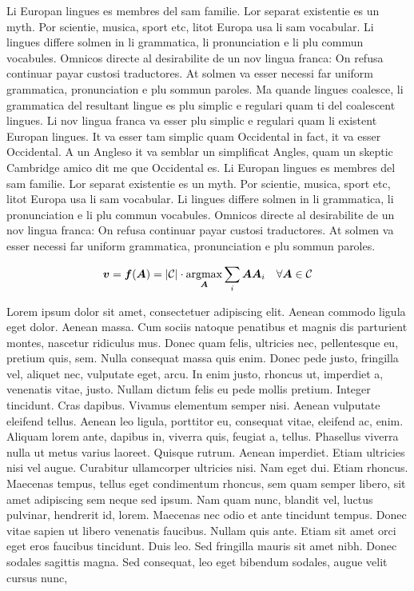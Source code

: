 Li Europan lingues es membres del sam familie. Lor separat existentie es un 
myth. Por scientie, musica, sport etc, litot Europa usa li sam vocabular. Li 
lingues differe solmen in li grammatica, li pronunciation e li plu commun 
vocabules. Omnicos directe al desirabilite de un nov lingua franca: On refusa 
continuar payar custosi traductores. At solmen va esser necessi far uniform 
grammatica, pronunciation e plu sommun paroles. Ma quande lingues coalesce, li 
grammatica del resultant lingue es plu simplic e regulari quam ti del coalescent 
lingues. Li nov lingua franca va esser plu simplic e regulari quam li existent 
Europan lingues. It va esser tam simplic quam Occidental in fact, it va esser 
Occidental. A un Angleso it va semblar un simplificat Angles, quam un skeptic 
Cambridge amico dit me que Occidental es. Li Europan lingues es membres del sam 
familie. Lor separat existentie es un myth. Por scientie, musica, sport etc, 
litot Europa usa li sam vocabular. Li lingues differe solmen in li grammatica, 
li pronunciation e li plu commun vocabules. Omnicos directe al desirabilite de 
un nov lingua franca: On refusa continuar payar custosi traductores. At solmen 
va esser necessi far uniform grammatica, pronunciation e plu sommun paroles. 

\begin{equation}
\vec{v} = \vec{f(\mat{A})} = |{\cal C}| \cdot \argmax_{\mat{A}}  \sum_i{\mat{A}\vec{A}_i}
\quad\forall\mat{A}\in{\cal C}
\end{equation}

Lorem ipsum dolor sit amet, consectetuer adipiscing elit. Aenean commodo ligula 
eget dolor. Aenean massa. Cum sociis natoque penatibus et magnis dis parturient 
montes, nascetur ridiculus mus. Donec quam felis, ultricies nec, pellentesque 
eu, pretium quis, sem. Nulla consequat massa quis enim. Donec pede justo, 
fringilla vel, aliquet nec, vulputate eget, arcu. In enim justo, rhoncus ut, 
imperdiet a, venenatis vitae, justo. Nullam dictum felis eu pede mollis pretium. 
Integer tincidunt. Cras dapibus. Vivamus elementum semper nisi. Aenean vulputate 
eleifend tellus. Aenean leo ligula, porttitor eu, consequat vitae, eleifend ac, 
enim. Aliquam lorem ante, dapibus in, viverra quis, feugiat a, tellus. Phasellus 
viverra nulla ut metus varius laoreet. Quisque rutrum. Aenean imperdiet. Etiam 
ultricies nisi vel augue. Curabitur ullamcorper ultricies nisi. Nam eget dui. 
Etiam rhoncus. Maecenas tempus, tellus eget condimentum rhoncus, sem quam semper 
libero, sit amet adipiscing sem neque sed ipsum. Nam quam nunc, blandit vel, 
luctus pulvinar, hendrerit id, lorem. Maecenas nec odio et ante tincidunt 
tempus. Donec vitae sapien ut libero venenatis faucibus. Nullam quis ante. Etiam 
sit amet orci eget eros faucibus tincidunt. Duis leo. Sed fringilla mauris sit 
amet nibh. Donec sodales sagittis magna. Sed consequat, leo eget bibendum 
sodales, augue velit cursus nunc, 

